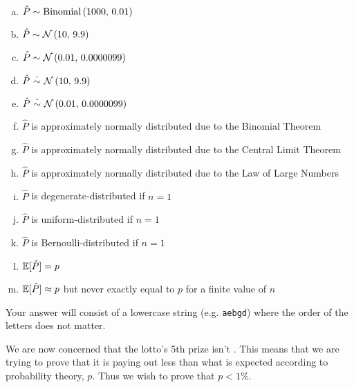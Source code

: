 \documentclass[12pt,landscape]{article}
\newcommand{\instr}{\small Your answer will consist of a lowercase string (e.g. \texttt{aebgd}) where the order of the letters does not matter. \normalsize}
\begin{document}
\vspace{-0.2cm}\benum{} 
\begin{enumerate}[(a)]
\item $\hat{P} \sim \mathrm{Binomial}\left(1000,\,0.01\right)$
\item $\hat{P} \sim \mathcal{N}\left(10,\,9.9\right)$
\item $\hat{P} \sim \mathcal{N}\left(0.01,\,0.0000099\right)$
\item $\hat{P} \approxdist \normnot{10}{9.9}$
\item $\hat{P} \approxdist \normnot{0.01}{0.0000099}$
\item $\hat{P}$ is approximately normally distributed due to the Binomial Theorem
\item $\hat{P}$ is approximately normally distributed due to the Central Limit Theorem
\item $\hat{P}$ is approximately normally distributed due to the Law of Large Numbers
\item $\hat{P}$ is degenerate-distributed if $n=1$
\item $\hat{P}$ is uniform-distributed if $n=1$
\item $\hat{P}$ is Bernoulli-distributed if $n=1$
\item $\mathbb{E}[{\hat{P}}] = p$
\item $\mathbb{E}[{\hat{P}}] \approx p$ but never exactly equal to $p$ for a finite value of $n$
\end{enumerate}
\eenum\instr\pagebreak



\problem{}  We are now concerned that the lotto's 5th prize isn't . This means that we are trying to prove that it is paying out less than what is expected according to probability theory, $p$. Thus we wish to prove that $p < 1\%$.
\end{document}

